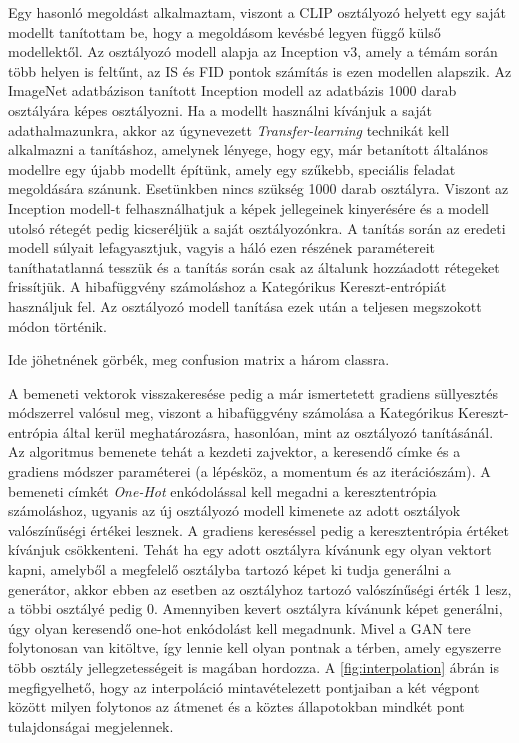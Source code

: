 Egy hasonló megoldást alkalmaztam, viszont a CLIP osztályozó helyett egy saját modellt tanítottam be, hogy a megoldásom kevésbé legyen függő külső modellektől. Az osztályozó modell alapja az Inception v3, amely a témám során több helyen is feltűnt, az IS és FID pontok számítás is ezen modellen alapszik. Az ImageNet \cite{deng2009imagenet} adatbázison tanított Inception modell az adatbázis 1000 darab osztályára képes osztályozni. Ha a modellt használni kívánjuk a saját adathalmazunkra, akkor az úgynevezett \textit{Transfer-learning} technikát kell alkalmazni a tanításhoz, amelynek lényege, hogy egy, már betanított általános modellre egy újabb modellt építünk, amely egy szűkebb, speciális feladat megoldására szánunk. Esetünkben nincs szükség 1000 darab osztályra. Viszont az Inception modell-t felhasználhatjuk a képek jellegeinek kinyerésére és a modell utolsó rétegét pedig kicseréljük a saját osztályozónkra.
A tanítás során az eredeti modell súlyait lefagyasztjuk, vagyis a háló ezen részének paramétereit taníthatatlanná tesszük és a tanítás során csak az általunk hozzáadott rétegeket frissítjük.
A hibafüggvény számoláshoz a Kategórikus Kereszt-entrópiát használjuk fel. Az osztályozó modell tanítása ezek után a teljesen megszokott módon történik.

Ide jöhetnének görbék, meg confusion matrix a három classra.

A bemeneti vektorok visszakeresése pedig a már ismertetett gradiens süllyesztés módszerrel valósul meg, viszont a hibafüggvény számolása a Kategórikus Kereszt-entrópia által kerül meghatározásra, hasonlóan, mint az osztályozó tanításánál. Az algoritmus bemenete tehát a kezdeti zajvektor, a keresendő címke és a gradiens módszer paraméterei (a lépésköz, a momentum és az iterációszám).
A bemeneti címkét \textit{One-Hot} enkódolással kell megadni a keresztentrópia számoláshoz, ugyanis az új osztályozó modell kimenete az adott osztályok valószínűségi értékei lesznek. A gradiens kereséssel pedig a keresztentrópia értéket kívánjuk csökkenteni. Tehát ha egy adott osztályra kívánunk egy olyan vektort kapni, amelyből a megfelelő osztályba tartozó képet ki tudja generálni a generátor, akkor ebben az esetben az osztályhoz tartozó valószínűségi érték 1 lesz, a többi osztályé pedig 0.
Amennyiben kevert osztályra kívánunk képet generálni, úgy olyan keresendő one-hot enkódolást kell megadnunk. Mivel a GAN tere folytonosan van kitöltve, így lennie kell olyan pontnak a térben, amely egyszerre több osztály jellegzetességeit is magában hordozza. A \ref{fig:interpolation} ábrán is megfigyelhető, hogy az interpoláció mintavételezett pontjaiban a két végpont között milyen folytonos az átmenet és a köztes állapotokban mindkét pont tulajdonságai megjelennek.

